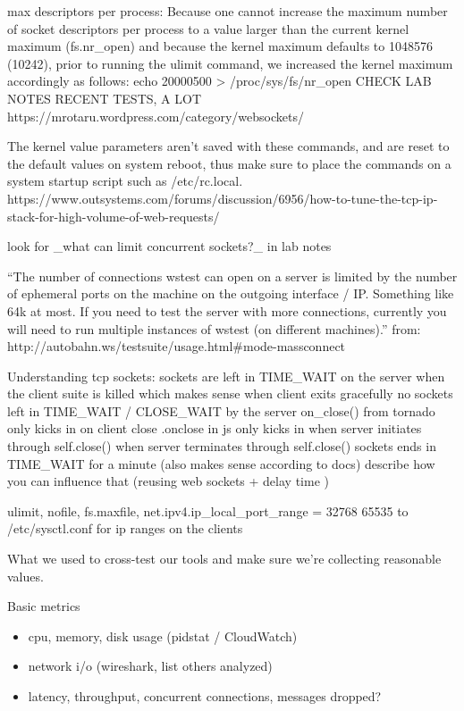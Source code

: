 \documentclass{uvamscse}
\begin{document}
max descriptors per process:
Because one cannot increase the maximum number of socket descriptors per process to a value larger than the current kernel maximum (fs.nr\_open) and because the kernel maximum defaults to 1048576 (10242), prior to running the ulimit command, we increased the kernel maximum accordingly as follows:
echo 20000500 > /proc/sys/fs/nr\_open
CHECK LAB NOTES RECENT TESTS, A LOT
https://mrotaru.wordpress.com/category/websockets/

The kernel value parameters aren't saved with these commands, and are reset to the default values on system reboot, thus make sure to place the commands on a system startup script such as /etc/rc.local.
https://www.outsystems.com/forums/discussion/6956/how-to-tune-the-tcp-ip-stack-for-high-volume-of-web-requests/

look for \_what can limit concurrent sockets?\_ in lab notes

“The number of connections wstest can open on a server is limited by the number of ephemeral ports on the machine on the outgoing interface / IP. Something like 64k at most. If you need to test the server with more connections, currently you will need to run multiple instances of wstest (on different machines).” from: http://autobahn.ws/testsuite/usage.html\#mode-massconnect

Understanding tcp sockets:
sockets are left in TIME\_WAIT on the server when the client suite is killed which makes sense
when client exits gracefully no sockets left in TIME\_WAIT / CLOSE\_WAIT by the server
on\_close() from tornado only kicks in on client close
.onclose in js only kicks in when server initiates through self.close()
when server terminates through self.close() sockets ends in TIME\_WAIT for a minute (also makes sense according to docs)
describe how you can influence that (reusing web sockets + delay time )

ulimit, nofile, fs.max\-file, net.ipv4.ip\_local\_port\_range = 32768 65535  to /etc/sysctl.conf for ip ranges on the clients

What we used to cross-test our tools and make sure we're collecting reasonable values.

Basic metrics
\begin{itemize}
  \item cpu, memory, disk usage (pidstat / CloudWatch)
  \item network i/o (wireshark, list others analyzed)
  \item latency, throughput, concurrent connections, messages dropped?
\end{itemize}
\end{document}
